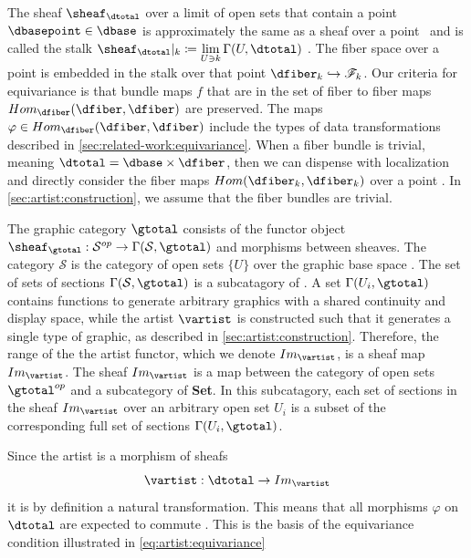 \documentclass[10pt,journal,compsoc]{IEEEtran}
\theoremstyle{definition}
\theoremstyle{remark}
\begin{document}
The sheaf $\sheaf_{\dtotal}$ over a limit of open sets that contain a point $\dbasepoint \in \dbase$ is approximately the same as a sheaf over a point \dbasepoint\ and is called the stalk $\sheaf_{\mathcal{\dtotal}}|_{k}\coloneqq \lim\limits_{U\ni k} \Gamma(U, \dtotal)$ \cite{StalkSheaf2019}. The fiber space over a point is embedded in the stalk over that point $\dfiber_{k}\hookrightarrow \mathscr{F}_{k}$. Our criteria for equivariance is that bundle maps $f$ that are in the set of fiber to fiber maps $Hom_{\mathcal{\dfiber}}(\dfiber,\dfiber)$ are preserved. The maps $\varphi \in Hom_{\mathcal{\dfiber}}(\dfiber,\dfiber)$ include the types of data transformations described in \autoref{sec:related-work:equivariance}. When a fiber bundle is trivial, meaning $\dtotal=\dbase \times \dfiber$, then we can dispense with localization and directly consider the fiber maps $Hom(\dfiber_{k}, \dfiber_{k})$ over a point \dbasepoint. In \autoref{sec:artist:construction}, we assume that the fiber bundles are trivial.

The graphic category $\mathcal{\gtotal}$ consists of the functor object $\sheaf_{\gtotal}: \mathcal{S}^{op} \rightarrow \Gamma(\mathcal{S}, \gtotal)$ and morphisms between sheaves. The category $\mathcal{S}$ is the category of open sets $\{U\}$ over the graphic base space \gbase. The set of sets of sections $\Gamma(\mathcal{S}, \gtotal)$ is a subcatagory of . A set $\Gamma(U_i, \gtotal)$ contains functions to generate arbitrary graphics with a shared continuity and display space, while the artist $\vartist$ is constructed such that it generates a single type of graphic, as described in \autoref{sec:artist:construction}. Therefore, the range of the the artist functor, which we denote $Im_{\vartist}$, is a sheaf map $Im_{\vartist}$. The sheaf $Im_{\vartist}$ is a map between the category of open sets $\gtotal^{op}$ and a subcategory of \textbf{Set}. In this subcatagory, each set of sections in the sheaf $Im_{\vartist}$ over an arbitrary open set $U_{i}$ is a subset of the corresponding full set of sections $\Gamma(U_i, \gtotal)$. 

Since the artist is a morphism of sheafs
\begin{equation}
  \vartist: \mathcal{\dtotal} \rightarrow Im_{\vartist}
\end{equation}
it is by definition a natural transformation\cite{SheafMathematics2021,bradleyWhatNaturalTransformation}. This means that all morphisms $\varphi$ on $\mathcal{\dtotal}$ are expected to commute \cite{spanier1989algebraic,fongInvitationAppliedCategory2019}. This is the basis of the equivariance condition illustrated in \autoref{eq:artist:equivariance}
\end{document}
